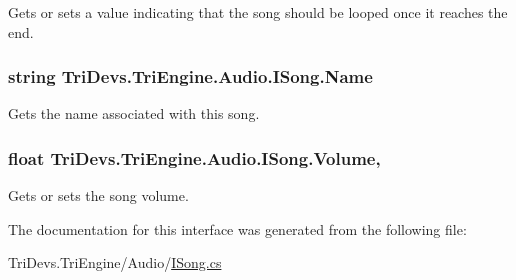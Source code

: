 Gets or sets a value indicating that the song should be looped once it reaches the end. 

\hypertarget{interface_tri_devs_1_1_tri_engine_1_1_audio_1_1_i_song_a91fdaeb52931f21f1d9b98e5ea49523e}{
\subsubsection[{Name}]{\setlength{\rightskip}{0pt plus 5cm}string Tri\-Devs.\-Tri\-Engine.\-Audio.\-I\-Song.\-Name\hspace{0.3cm}{\ttfamily [get]}}}\label{interface_tri_devs_1_1_tri_engine_1_1_audio_1_1_i_song_a91fdaeb52931f21f1d9b98e5ea49523e}


Gets the name associated with this song. 

\hypertarget{interface_tri_devs_1_1_tri_engine_1_1_audio_1_1_i_song_aca29bef6067582a446c872d86b8b7130}{
\subsubsection[{Volume}]{\setlength{\rightskip}{0pt plus 5cm}float Tri\-Devs.\-Tri\-Engine.\-Audio.\-I\-Song.\-Volume\hspace{0.3cm}{\ttfamily [get]}, {\ttfamily [set]}}}\label{interface_tri_devs_1_1_tri_engine_1_1_audio_1_1_i_song_aca29bef6067582a446c872d86b8b7130}


Gets or sets the song volume. 



The documentation for this interface was generated from the following file\-:\begin{DoxyCompactItemize}
\item 
Tri\-Devs.\-Tri\-Engine/\-Audio/\hyperlink{_i_song_8cs}{I\-Song.\-cs}\end{DoxyCompactItemize}
